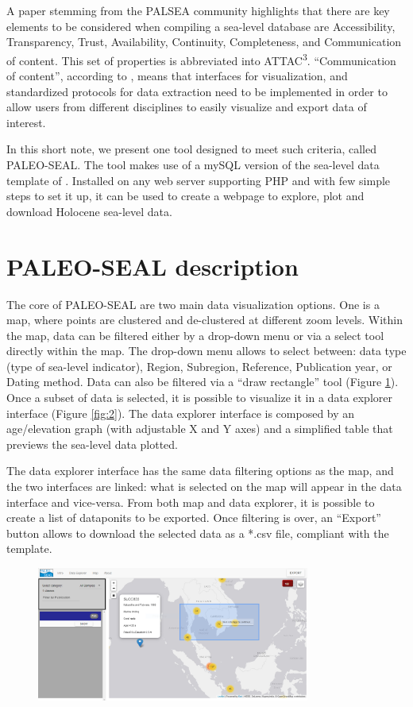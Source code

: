 \documentclass[a4paper,fleqn]{cas-dc}
\begin{document}
A paper stemming from the PALSEA community \citep{dusterhus2016} highlights that there are key elements to be considered when compiling a sea-level database are Accessibility, Transparency, Trust, Availability, Continuity, Completeness, and Communication of
content. This set of properties is abbreviated into ATTAC\textsuperscript{3}. ``Communication of content'',  according to \citet{dusterhus2016}, means that interfaces for visualization, and standardized protocols for data extraction need to be implemented in order to allow users from different disciplines to easily visualize and export data of interest. 

In this short note, we present one tool designed to meet such criteria, called PALEO-SEAL. The tool makes use of a mySQL version of the sea-level data template of \citet{khan2019}. Installed on any web server supporting PHP and with few simple steps to set it up, it can be used to create a webpage to explore, plot and download Holocene sea-level data. 

\section{PALEO-SEAL description}
The core of PALEO-SEAL are two main data visualization options. One is a map, where points are clustered and de-clustered at different zoom levels. Within the map, data can be filtered either by a drop-down menu or via a select tool directly within the map. The drop-down menu allows to select between: data type (type of sea-level indicator), Region, Subregion, Reference, Publication year, or Dating method. Data can also be filtered via a ``draw rectangle'' tool (Figure \ref{fig:1}). Once a subset of data is selected, it is possible to visualize it in a data explorer interface (Figure \ref{fig:2}). The data explorer interface is composed by an age/elevation graph (with adjustable X and Y axes) and a simplified table that previews the sea-level data plotted. 

The data explorer interface has the same data filtering options as the map, and the two interfaces are linked: what is selected on the map will appear in the data interface and vice-versa. From both map and data explorer, it is possible to create a list of dataponits to be exported. Once filtering is over, an ``Export'' button allows to download the selected data as a *.csv file, compliant with the \citet{khan2019} template.

\begin{figure}
	\centering
	\includegraphics[width=0.8\textwidth]{figs/Figure1.png}
	\caption{}
	\label{fig:1}
\end{figure}
\end{document}
